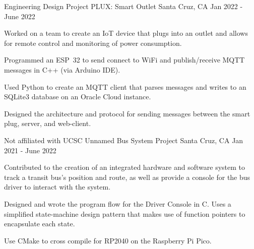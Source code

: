 \begin{cventries}
  \cventry
    {Engineering Design Project} %
    {PLUX: Smart Outlet} %
    {Santa Cruz, CA} %
    {Jan 2022 - June 2022} %
    {
      \begin{cvitems} %
        \item {Worked on a team to create an IoT device that plugs into an outlet and allows for remote control and monitoring of power consumption.}
        \item {Programmed an ESP~32 to send connect to WiFi and publish/receive MQTT messages in C++ (via Arduino IDE).}
        \item {Used Python to create an MQTT client that parses messages and writes to an SQLite3 database on an Oracle Cloud instance.}
        \item {Designed the architecture and protocol for sending messages between the smart plug, server, and web-client.}
      \end{cvitems}
    }

  \cventry
    {Not affiliated with UCSC} %
    {Unnamed Bus System Project} %
    {Santa Cruz, CA} %
    {Jan 2021 - June 2022} %
    {
      \begin{cvitems} %
      	\item {Contributed to the creation of an integrated hardware and software system to track a transit bus's position and  route, as well as provide a console for the bus driver to interact with the system.}
      	\item {Designed and wrote the program flow for the Driver Console in C. Uses a simplified state-machine design pattern that makes use of function pointers to encapsulate each state.}
      	\item {Use CMake to cross compile for RP2040 on the Raspberry Pi Pico.}
      \end{cvitems}
    }
    
\end{cventries}